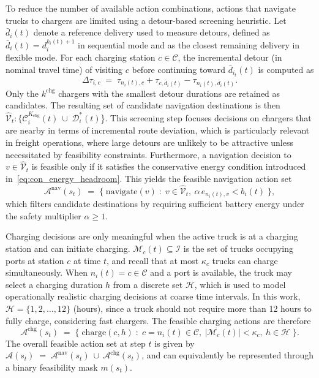 \documentclass[a4paper,fleqn]{cas-sc}
\begin{document}
To reduce the number of available action combinations, actions that navigate trucks to chargers are limited using a detour-based screening heuristic. 
Let $\bar{d}_{i}(t)$ denote a reference delivery used to measure detours, defined as $\bar{d}_{i}(t)=d_{i}^{k_{i}(t)+1}$ in sequential mode and as the closest remaining delivery in flexible mode.
For each charging station $c\in\mathcal{C}$, the incremental detour (in nominal travel time) of visiting $c$ before continuing toward $\bar{d}_{i_t}(t)$ is computed as
\begin{equation}
\Delta \tau _{i,c} \;=\;\tau_{n_{i}(t),c}+\tau_{c,\bar{d}_{i}(t)}-\tau_{n_{i}(t),\bar{d}_{i}(t)}.
\label{eq:charger_detour}
\end{equation}
Only the $k^{\mathrm{chg}}$ chargers with the smallest detour durations are retained as candidates.
The resulting set of candidate navigation destinations is then
$\hat{\mathcal{V}}_{t}:\{\mathcal{C}^{K_{\mathrm{chg}}}_{i}(t)\ \cup\ \mathcal{D}^{*}_{i}(t)$\}.
This screening step focuses decisions on chargers that are nearby in terms of incremental route deviation, which is particularly relevant in freight operations, where large detours are unlikely to be attractive unless necessitated by feasibility constraints.
Furthermore, a navigation decision to $v\in\hat{\mathcal{V}}_{t}$ is feasible only if it satisfies the conservative energy condition introduced in~\eqref{eq:con_energy_headroom}. This yields the feasible navigation action set
\begin{equation}
\mathcal{A}^{\mathrm{nav}}(s_t)\;=\;\Big\{\;\text{navigate}(v)\;:\; v\in \hat{\mathcal{V}}_{t},\ \alpha\,e_{n_{i}(t),v}<b_{i}(t)\;\Big\},
\label{eq:feasible_nav}
\end{equation}
which filters candidate destinations by requiring sufficient battery energy under the safety multiplier $\alpha\ge 1$.

Charging decisions are only meaningful when the active truck is at a charging station and can initiate charging.
$\mathcal{M}_c(t)\subseteq\mathcal{I}$ is the set of trucks occupying ports at station $c$ at time $t$, and recall that at most $\kappa_c$ trucks can charge simultaneously.
When $n_i(t)=c\in\mathcal{C}$ and a port is available, the truck may select a charging duration $h$ from a discrete set $\mathcal{H}$, which is used to model operationally realistic charging decisions at coarse time intervals. In this work, $\mathcal{H}=\{1,2,\ldots,12\}$ (hours), since a truck should not require more than 12 hours to fully charge, considering fast chargers. The feasible charging actions are therefore
\begin{equation}
\mathcal{A}^{\mathrm{chg}}(s_t)\;=\;\Big\{\;\text{charge}(c,h)\;:\; c=n_{i}(t)\in\mathcal{C},\ |\mathcal{M}_c(t)|<\kappa_c,\ h\in\mathcal{H}\;\Big\}.
\label{eq:feasible_charge}
\end{equation}
The overall feasible action set at step $t$ is given by
$\mathcal{A}(s_t)\;=\;\mathcal{A}^{\mathrm{nav}}(s_t)\ \cup\ \mathcal{A}^{\mathrm{chg}}(s_t)$,
and can equivalently be represented through a binary feasibility mask $m(s_t)$.
\end{document}
